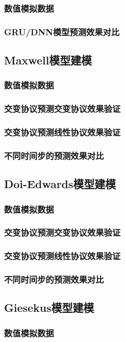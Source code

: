 \subsubsection{数值模拟数据}
\subsubsection{GRU/DNN模型预测效果对比}
\subsection{Maxwell模型建模}
\subsubsection{数值模拟数据}
\subsubsection{交变协议预测交变协议效果验证}
\subsubsection{交变协议预测线性协议效果验证}
\subsubsection{不同时间步的预测效果对比}
\subsection{Doi-Edwards模型建模}
\subsubsection{数值模拟数据}
\subsubsection{交变协议预测交变协议效果验证}
\subsubsection{交变协议预测线性协议效果验证}
\subsubsection{不同时间步的预测效果对比}
\subsection{Giesekus模型建模}
\subsubsection{数值模拟数据}
